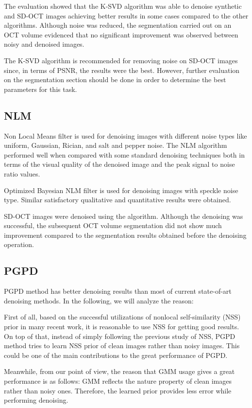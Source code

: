 The evaluation showed that the K-SVD algorithm was able to denoise synthetic and SD-OCT images achieving better results in some cases compared to the other algorithms.  Although noise was reduced, the segmentation carried out on an OCT volume evidenced that no significant improvement was observed between noisy and denoised images.

The K-SVD algorithm is recommended for removing noise on SD-OCT images since, in terms of PSNR, the results were the best. However, further evaluation on the segmentation section should be done in order to determine the best parameters for this task.

\subsection{NLM}

Non Local Means filter is used for denoising images with different noise types like uniform, Gaussian, Rician, and salt and pepper noise. The NLM algorithm performed well when compared with some standard denoising techniques both in terms of the visual quality of the denoised image and the peak signal to noise ratio values. 

     Optimized Bayesian NLM filter is used for denoising images with speckle noise type. Similar satisfactory qualitative and quantitative results were obtained.
     
     SD-OCT images were denoised using the algorithm. Although the denoising was successful, the subsequent OCT volume segmentation did not show much improvement compared to the segmentation results obtained before the denoising operation. 
\subsection{PGPD}
PGPD method has better denoising results than most of current state-of-art denoising methods. In the following, we will analyze the reason:

First of all, based on the successful utilizations of nonlocal self-similarity (NSS) prior in many recent work, it is reasonable to use NSS for getting good results.
On top of that, instead of simply following the previous study of NSS, PGPD method tries to learn NSS prior of clean images rather than noisy images. This could be one of the main contributions to the great performance of PGPD.

Meanwhile, from our point of view, the reason that GMM usage gives a great performance is as follows: GMM reflects the nature property of clean images rather than noisy ones. Therefore, the learned prior provides less error while performing denoising.
      